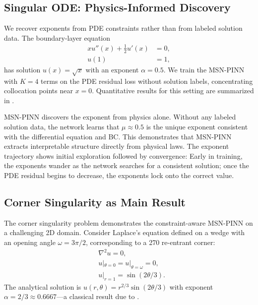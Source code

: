 \documentclass{article}
\theoremstyle{plain}
\theoremstyle{definition}
\theoremstyle{remark}
\begin{document}
\subsection{Singular ODE: Physics-Informed Discovery}
\label{sec:exp3}

We recover exponents from PDE constraints rather than from labeled solution data. The boundary-layer equation
\begin{equation}
	\begin{aligned}
		x u''(x) + \frac{1}{2} u'(x) & = 0, \\
		u(1)                         & = 1,
	\end{aligned}
\end{equation}
has solution $u(x) = \sqrt{x}$ with an exponent $\alpha = 0.5$. We train the MSN-PINN with $K=4$ terms on the PDE residual loss without solution labels, concentrating collocation points near $x=0$. Quantitative results for this setting are summarized in .

MSN-PINN discovers the exponent from physics alone. Without any labeled solution data, the network learns that $\mu \approx 0.5$ is the unique exponent consistent with the differential equation and BC. This demonstrates that MSN-PINN extracts interpretable structure directly from physical laws. The exponent trajectory shows initial exploration followed by convergence: Early in training, the exponents wander as the network searches for a consistent solution; once the PDE residual begins to decrease, the exponents lock onto the correct value.

\subsection{Corner Singularity as Main Result}
\label{sec:exp4}

The corner singularity problem demonstrates the constraint-aware MSN-PINN on a challenging 2D domain. Consider Laplace's equation defined on a wedge with an opening angle $\omega = 3\pi/2$, corresponding to a 270\textdegree{} re-entrant corner:
\begin{equation}
	\begin{aligned}
		 & \nabla^2 u = 0,                         \\
		 & u|_{\theta=0} = u|_{\theta=\omega} = 0, \\
		 & u|_{r=1} = \sin(2\theta/3).
	\end{aligned}
\end{equation}
The analytical solution is $u(r,\theta) = r^{2/3} \sin(2\theta/3)$ with exponent $\alpha = 2/3 \approx 0.6667$---a classical result due to \citet{kondrat1967boundary}.
\end{document}

